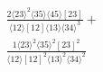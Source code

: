 \documentclass[varwidth, border=5pt]{standalone}
\begin{document}
\begin{my}
$\begin{gathered}
\scriptscriptstyle\frac{2⟨23⟩^2⟨35⟩⟨45⟩[23]}{⟨12⟩[12]⟨13⟩⟨34⟩^3}+\\
\scriptscriptstyle\frac{1⟨23⟩^2⟨35⟩^2[23]^2}{⟨12⟩[12]^2⟨13⟩^2⟨34⟩^2}\phantom{+}
\end{gathered}$
\end{my}
\end{document}
